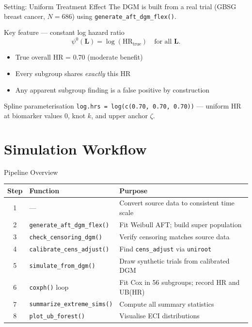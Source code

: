 \documentclass[
  11pt,
  ignorenonframetext,
  aspectratio=169,
]{beamer}
\providecommand{\tightlist}{%
  \setlength{\itemsep}{0pt}\setlength{\parskip}{0pt}}
\begin{document}
\begin{frame}[fragile]{Setting: Uniform Treatment Effect}
\protect{}\label{setting-uniform-treatment-effect}
The DGM is built from a real trial (GBSG breast cancer, \(N = 686\))
using \texttt{generate\_aft\_dgm\_flex()}.

\begin{block}{Key feature --- constant log hazard ratio}
$$\psi^{0}(\mathbf{L}) = \log(\mathrm{HR}_{\mathrm{true}}) \quad \text{for all } \mathbf{L}.$$
\end{block}

\begin{itemize}
\tightlist
\item
  True overall HR = 0.70 (moderate benefit)
\item
  Every subgroup shares \emph{exactly} this HR
\item
  Any apparent subgroup finding is a false positive by construction
\end{itemize}

\begin{exampleblock}{Spline parameterisation}
\texttt{log.hrs = log(c(0.70, 0.70, 0.70))} --- uniform HR at biomarker
values $0$, knot $k$, and upper anchor $\zeta$.
\end{exampleblock}
\end{frame}

\section{Simulation Workflow}\label{simulation-workflow}

\begin{frame}{Pipeline Overview}
\protect{}\label{pipeline-overview}
\small
\begin{center}
\begin{tabular}{clp{7cm}}
\toprule
\textbf{Step} & \textbf{Function} & \textbf{Purpose} \\
\midrule
1 & --- & Convert source data to consistent time scale \\
2 & \texttt{generate\_aft\_dgm\_flex()} & Fit Weibull AFT; build super population \\
3 & \texttt{check\_censoring\_dgm()} & Verify censoring matches source data \\
4 & \texttt{calibrate\_cens\_adjust()} & Find \texttt{cens\_adjust} via \texttt{uniroot} \\
5 & \texttt{simulate\_from\_dgm()} & Draw synthetic trials from calibrated DGM \\
6 & \texttt{coxph()} loop & Fit Cox in 56 subgroups; record HR and UB(HR) \\
7 & \texttt{summarize\_extreme\_sims()} & Compute all summary statistics \\
8 & \texttt{plot\_ub\_forest()} & Visualise ECI distributions \\
\bottomrule
\end{tabular}
\end{center}
\end{frame}
\end{document}
